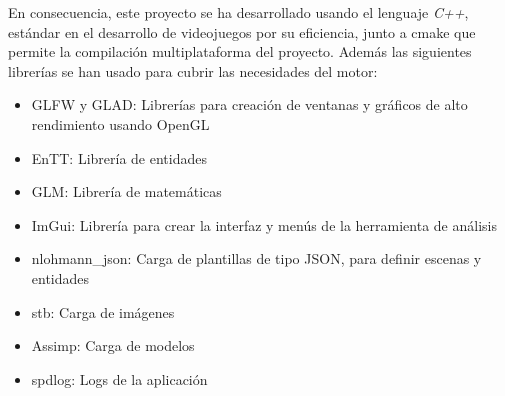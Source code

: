 En consecuencia, este proyecto se ha desarrollado usando el lenguaje \textit{C++}, estándar en el desarrollo de videojuegos por su eficiencia, junto a cmake\cite{cmake} que
permite la compilación multiplataforma del proyecto. Además las siguientes librerías se han usado para cubrir las necesidades del motor:
\begin{itemize}
    \item GLFW\cite{glfw} y GLAD\cite{glad}: Librerías para creación de ventanas y gráficos de alto rendimiento usando OpenGL\cite{opengl}
    \item EnTT\cite{entt}: Librería de entidades
    \item GLM\cite{glm}: Librería de matemáticas
    \item ImGui\cite{imgui}: Librería para crear la interfaz y menús de la herramienta de análisis
    \item nlohmann\_json\cite{nlohmann_json}: Carga de plantillas de tipo JSON, para definir escenas y entidades
    \item stb\cite{stb}: Carga de imágenes
    \item Assimp\cite{assimp}: Carga de modelos
    \item spdlog\cite{spdlog}: Logs de la aplicación
\end{itemize}
